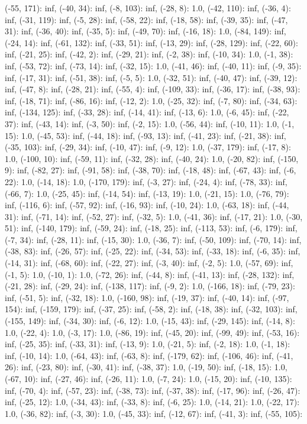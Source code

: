 \documentclass[parskip=half]{scrartcl}
\begin{document}
(-55, 171): inf, (-40, 34): inf, (-8, 103): inf, (-28, 8): 1.0, (-42, 110): inf, (-36, 4): inf, (-31, 119): inf, (-5, 28): inf, (-58, 22): inf, (-18, 58): inf, (-39, 35): inf, (-47, 31): inf, (-36, 40): inf, (-35, 5): inf, (-49, 70): inf, (-16, 18): 1.0, (-84, 149): inf, (-24, 14): inf, (-61, 132): inf, (-33, 51): inf, (-13, 29): inf, (-28, 129): inf, (-22, 60): inf, (-21, 25): inf, (-42, 2): inf, (-29, 21): inf, (-2, 38): inf, (-10, 34): 1.0, (-1, 38): inf, (-53, 72): inf, (-73, 14): inf, (-32, 15): 1.0, (-41, 46): inf, (-40, 11): inf, (-9, 35): inf, (-17, 31): inf, (-51, 38): inf, (-5, 5): 1.0, (-32, 51): inf, (-40, 47): inf, (-39, 12): inf, (-47, 8): inf, (-28, 21): inf, (-55, 4): inf, (-109, 33): inf, (-36, 17): inf, (-38, 93): inf, (-18, 71): inf, (-86, 16): inf, (-12, 2): 1.0, (-25, 32): inf, (-7, 80): inf, (-34, 63): inf, (-134, 125): inf, (-33, 28): inf, (-14, 41): inf, (-13, 6): 1.0, (-6, 45): inf, (-22, 37): inf, (-43, 14): inf, (-3, 50): inf, (-2, 15): 1.0, (-56, 44): inf, (-10, 11): 1.0, (-1, 15): 1.0, (-45, 53): inf, (-44, 18): inf, (-93, 13): inf, (-41, 23): inf, (-21, 38): inf, (-35, 103): inf, (-29, 34): inf, (-10, 47): inf, (-9, 12): 1.0, (-37, 179): inf, (-17, 8): 1.0, (-100, 10): inf, (-59, 11): inf, (-32, 28): inf, (-40, 24): 1.0, (-20, 82): inf, (-150, 9): inf, (-82, 27): inf, (-91, 58): inf, (-38, 70): inf, (-18, 48): inf, (-67, 43): inf, (-6, 22): 1.0, (-14, 18): 1.0, (-170, 179): inf, (-3, 27): inf, (-24, 4): inf, (-78, 33): inf, (-66, 7): 1.0, (-25, 45): inf, (-14, 54): inf, (-13, 19): 1.0, (-21, 15): 1.0, (-76, 79): inf, (-116, 6): inf, (-57, 92): inf, (-16, 93): inf, (-10, 24): 1.0, (-63, 18): inf, (-44, 31): inf, (-71, 14): inf, (-52, 27): inf, (-32, 5): 1.0, (-41, 36): inf, (-17, 21): 1.0, (-30, 51): inf, (-140, 179): inf, (-59, 24): inf, (-18, 25): inf, (-113, 53): inf, (-6, 179): inf, (-7, 34): inf, (-28, 11): inf, (-15, 30): 1.0, (-36, 7): inf, (-50, 109): inf, (-70, 14): inf, (-38, 83): inf, (-26, 57): inf, (-25, 22): inf, (-34, 53): inf, (-33, 18): inf, (-6, 35): inf, (-14, 31): inf, (-68, 60): inf, (-22, 27): inf, (-3, 40): inf, (-2, 5): 1.0, (-57, 69): inf, (-1, 5): 1.0, (-10, 1): 1.0, (-72, 26): inf, (-44, 8): inf, (-41, 13): inf, (-28, 132): inf, (-21, 28): inf, (-29, 24): inf, (-138, 117): inf, (-9, 2): 1.0, (-166, 18): inf, (-79, 23): inf, (-51, 5): inf, (-32, 18): 1.0, (-160, 98): inf, (-19, 37): inf, (-40, 14): inf, (-97, 154): inf, (-159, 179): inf, (-37, 25): inf, (-58, 2): inf, (-18, 38): inf, (-32, 103): inf, (-155, 149): inf, (-34, 30): inf, (-6, 12): 1.0, (-15, 43): inf, (-29, 145): inf, (-14, 8): 1.0, (-22, 4): 1.0, (-3, 17): 1.0, (-86, 19): inf, (-45, 20): inf, (-99, 49): inf, (-53, 16): inf, (-25, 35): inf, (-33, 31): inf, (-13, 9): 1.0, (-21, 5): inf, (-2, 18): 1.0, (-1, 18): inf, (-10, 14): 1.0, (-64, 43): inf, (-63, 8): inf, (-179, 62): inf, (-106, 46): inf, (-41, 26): inf, (-23, 80): inf, (-30, 41): inf, (-38, 37): 1.0, (-19, 50): inf, (-18, 15): 1.0, (-67, 10): inf, (-27, 46): inf, (-26, 11): 1.0, (-7, 24): 1.0, (-15, 20): inf, (-10, 135): inf, (-70, 4): inf, (-57, 23): inf, (-38, 73): inf, (-37, 38): inf, (-17, 96): inf, (-26, 47): inf, (-25, 12): 1.0, (-34, 43): inf, (-33, 8): inf, (-6, 25): 1.0, (-14, 21): 1.0, (-22, 17): 1.0, (-36, 82): inf, (-3, 30): 1.0, (-45, 33): inf, (-12, 67): inf, (-41, 3): inf, (-55, 105): 
\end{document}
